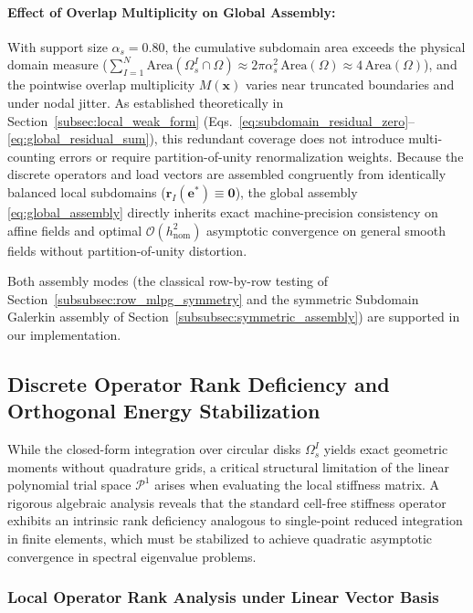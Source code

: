 \documentclass[preprint,12pt]{elsarticle}
\begin{document}
\paragraph{Effect of Overlap Multiplicity on Global Assembly:}
With support size $\alpha_s = 0.80$, the cumulative subdomain area exceeds the physical domain measure ($\sum_{I=1}^N \mathrm{Area}(\Omega_s^I \cap \Omega) \approx 2\pi \alpha_s^2 \, \mathrm{Area}(\Omega) \approx 4\,\mathrm{Area}(\Omega)$), and the pointwise overlap multiplicity $M(\mathbf{x})$ varies near truncated boundaries and under nodal jitter. As established theoretically in Section~\ref{subsec:local_weak_form} (Eqs.~\eqref{eq:subdomain_residual_zero}--\eqref{eq:global_residual_sum}), this redundant coverage does not introduce multi-counting errors or require partition-of-unity renormalization weights. Because the discrete operators and load vectors are assembled congruently from identically balanced local subdomains ($\mathbf{r}_I(\mathbf{e}^*) \equiv \mathbf{0}$), the global assembly \eqref{eq:global_assembly} directly inherits exact machine-precision consistency on affine fields and optimal $\mathcal{O}(h_{\mathrm{nom}}^2)$ asymptotic convergence on general smooth fields without partition-of-unity distortion.

Both assembly modes (the classical row-by-row testing of Section~\ref{subsubsec:row_mlpg_symmetry} and the symmetric Subdomain Galerkin assembly of Section~\ref{subsubsec:symmetric_assembly}) are supported in our implementation.

\subsection{Discrete Operator Rank Deficiency and Orthogonal Energy Stabilization}
\label{subsec:rank_deficiency_stabilization}

While the closed-form integration over circular disks $\Omega_s^I$ yields exact geometric moments without quadrature grids, a critical structural limitation of the linear polynomial trial space $\mathcal{P}^1$ arises when evaluating the local stiffness matrix. A rigorous algebraic analysis reveals that the standard cell-free stiffness operator exhibits an intrinsic rank deficiency analogous to single-point reduced integration in finite elements, which must be stabilized to achieve quadratic asymptotic convergence in spectral eigenvalue problems.

\subsubsection{Local Operator Rank Analysis under Linear Vector Basis}
\label{subsubsec:local_rank_analysis}
\end{document}
